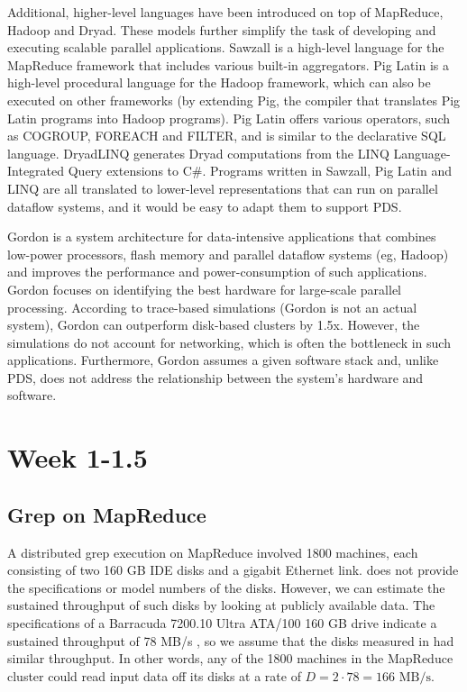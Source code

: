 \documentclass{acm_proc_article-sp}
\begin{document}
Additional, higher-level languages have been introduced on top of MapReduce, Hadoop and Dryad. These models further simplify the task of developing and executing scalable parallel applications. Sawzall \cite{sawzall} is a high-level language for the MapReduce framework that includes various built-in aggregators. Pig Latin \cite{piglatin} is a high-level procedural language for the Hadoop framework, which can also be executed on other frameworks (by extending Pig, the compiler that translates Pig Latin programs into Hadoop programs). Pig Latin offers various operators, such as COGROUP, FOREACH and FILTER, and is similar to the declarative SQL language. DryadLINQ \cite{dryadlinq} generates Dryad computations from the LINQ Language-Integrated Query extensions to C\#. Programs written in Sawzall, Pig Latin and LINQ are all translated to lower-level representations that can run on parallel dataflow systems, and it would be easy to adapt them to support PDS.

Gordon \cite{gordon} is a system architecture for data-intensive applications that combines low-power processors, flash memory and parallel dataflow systems (eg, Hadoop) and improves the performance and power-consumption of such applications. Gordon focuses on identifying the best hardware for large-scale parallel processing. According to trace-based simulations (Gordon is not an actual system), Gordon can outperform disk-based clusters by 1.5x. However, the simulations do not account for networking, which is often the bottleneck in such applications. Furthermore, Gordon assumes a given software stack and, unlike PDS, does not address the relationship between the system's hardware and software.

\section{Week 1-1.5}
\subsection{Grep on MapReduce}
A distributed grep execution on MapReduce involved 1800 machines, each consisting of two 160 GB IDE disks and a gigabit Ethernet link. \cite{mapreduce} does not provide the specifications or model numbers of the disks. However, we can estimate the sustained throughput of such disks by looking at publicly available data. The specifications of a Barracuda 7200.10 Ultra ATA/100 160 GB drive indicate a sustained throughput of 78 MB/s \cite{seagate160gb}, so we assume that the disks measured in \cite{mapreduce} had similar throughput. In other words, any of the 1800 machines in the MapReduce cluster could read input data off its disks at a rate of $D = 2 \cdot 78 = 166 \text{ MB/s}$.
\end{document}
